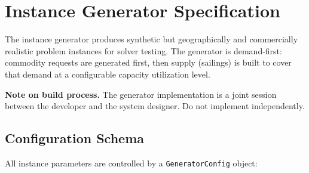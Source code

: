 \documentclass[11pt,a4paper]{article}
\theoremstyle{definition}
\begin{document}
\section{Instance Generator Specification}
\label{sec:instance}

The instance generator produces synthetic but geographically and commercially realistic
problem instances for solver testing. The generator is demand-first: commodity requests
are generated first, then supply (sailings) is built to cover that demand at a configurable
capacity utilization level.

\textbf{Note on build process.} The generator implementation is a joint session between the
developer and the system designer. Do not implement independently.

\subsection{Configuration Schema}

All instance parameters are controlled by a \texttt{GeneratorConfig} object:
\end{document}
